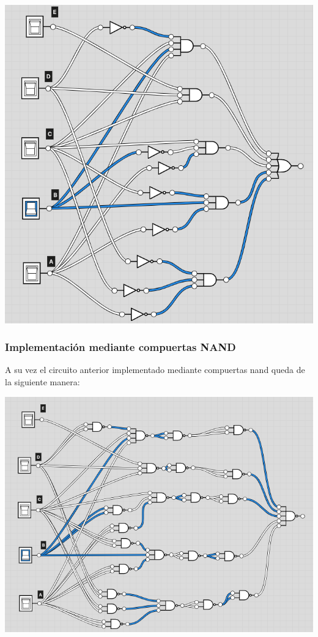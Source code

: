 \includegraphics{Ejercicio_2/circuitos/Ej2_parte1_logicly.png}


\subsubsection{Implementación mediante compuertas NAND}
A su vez el circuito anterior implementado mediante compuertas nand queda de la siguiente manera:

\includegraphics{Ejercicio_2/circuitos/Ej2_parte1_nand_logicly.png}


